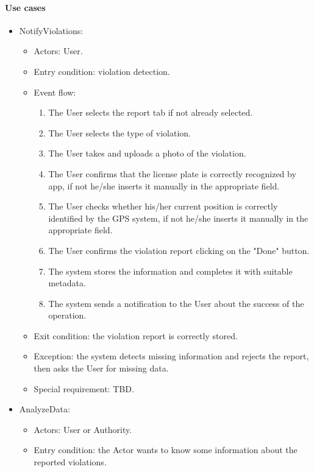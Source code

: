 \paragraph{Use cases}
    \begin{itemize}
        \item NotifyViolations:
        \begin{itemize}
            \item Actors: User.
            \item Entry condition: violation detection.
            \item Event flow:
            \begin{enumerate}
                \item The User selects the report tab if not already selected.
                \item The User selects the type of violation.
                \item The User takes and uploads a photo of the violation.
                \item The User confirms that the license plate is correctly recognized by app, if not he/she inserts it manually in the appropriate field.
                \item The User checks whether his/her current position is correctly identified by the GPS system, if not he/she inserts it manually in the appropriate field.
                \item The User confirms the violation report clicking on the "Done" button.
                \item The system stores the information and completes it with suitable metadata.
                \item The system sends a notification to the User about the success of the operation.
            \end{enumerate}
            \item Exit condition: the violation report is correctly stored.
            \item Exception: the system detects missing information and rejects the report, then asks the User for missing data.
            \item Special requirement: TBD.
        \end{itemize}
        \item AnalyzeData:
        \begin{itemize}
            \item Actors: User or Authority.
            \item Entry condition: the Actor wants to know some information about the reported violations.

\end{itemize}
\end{itemize}
